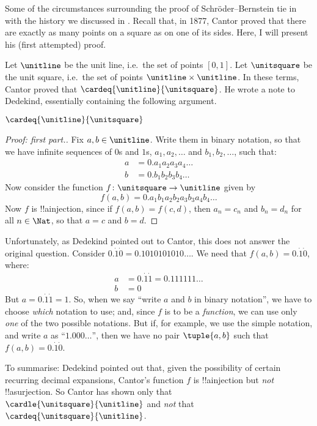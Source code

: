 \documentclass[../../../include/open-logic-section]{subfiles}
\begin{document}
Some of the circumstances surrounding the proof of Schr\"oder--Bernstein tie in with the history we discussed in . Recall that, in 1877, Cantor proved that there are exactly as many points on a square as on one of its sides. Here, I will present his (first attempted) proof.

Let $\unitline$ be the unit line, i.e.\ the set of points $[0,1]$. Let $\unitsquare$ be the unit square, i.e.\ the set of points $\unitline \times \unitline$. In these terms, Cantor proved that $\cardeq{\unitline}{\unitsquare}$. He wrote a note to Dedekind, essentially containing the following argument. 
\begin{thm}
	$\cardeq{\unitline}{\unitsquare}$
\end{thm}
\begin{proof}[Proof: first part.]
	Fix $a, b \in \unitline$. Write them in binary notation, so that we have infinite sequences of $0$s and $1$s, $a_1, a_2, \ldots$ and $b_1, b_2, \ldots$, such that:
	\begin{align*}
		a &= 0.a_1a_2a_3a_4\ldots\\
		b &= 0.b_1b_2b_3b_4\ldots
	\end{align*}
	Now consider the function $f \colon \unitsquare \to \unitline$ given by 
			$$f(a, b) = 0.a_1b_1a_2b_2a_3b_3a_4b_4\ldots$$
	Now $f$ is !!a{injection}, since if $f(a, b) = f(c,d)$, then  $a_n = c_n$ and $b_n = d_n$ for all $n \in \Nat$, so that $a = c$ and $b = d$. 
\end{proof}\noindent
Unfortunately, as Dedekind pointed out to Cantor, this does not answer the original question. Consider $0.\dot{1}\dot{0} = 0.1010101010\ldots$. We need that $f(a,b) = 0.\dot{1}\dot{0}$, where:
	\begin{align*}
		a&= 0.\dot{1}\dot{1} = 0.111111\ldots\\
		b&= 0
	\end{align*}
But $a = 0.\dot{1}\dot{1} = 1$. So, when we say ``write $a$ and $b$ in binary notation'', we have to choose \emph{which} notation to use; and, since $f$ is to be a \emph{function}, we can use only \emph{one} of the two possible notations. But if, for example, we use the simple notation, and write $a$ as ``$1.000\ldots$'', then we have no pair $\tuple{a, b}$ such that $f(a, b) = 0.\dot{1}\dot{0}$. 

To summarise: Dedekind pointed out that, given the possibility of certain recurring decimal expansions, Cantor's function $f$ is !!a{injection} but \emph{not} !!a{surjection}. So Cantor has shown only that $\cardle{\unitsquare}{\unitline}$ and \emph{not} that $\cardeq{\unitsquare}{\unitline}$. 
\end{document}
